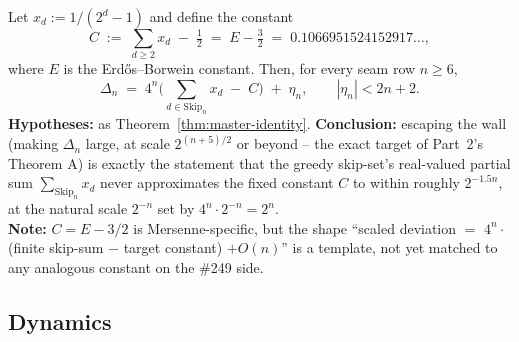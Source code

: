 \begin{thm}
\label{thm:real-form}
Let $x_d := 1/(2^d-1)$ and define the constant
\[
C \;:=\; \sum_{d \ge 2} x_d \;-\; \tfrac12 \;=\; E - \tfrac32 \;=\; 0.1066951524152917\ldots,
\]
where $E$ is the Erd\H{o}s--Borwein constant. Then, for every seam row $n \ge 6$,
\begin{equation*}
\Delta_n \;=\; 4^n \Big( \sum_{d \in \mathrm{Skip}_n} x_d \;-\; C \Big) \;+\; \eta_n, \qquad
|\eta_n| < 2n+2.
\tag{II}
\end{equation*}
\textbf{Hypotheses:} as Theorem~\ref{thm:master-identity}. \textbf{Conclusion:} escaping the wall
(making $\Delta_n$ large, at scale $2^{(n+5)/2}$ or beyond -- the exact target of Part~2's Theorem A)
is exactly the statement that the greedy skip-set's real-valued partial sum $\sum_{\mathrm{Skip}_n}
x_d$ never approximates the fixed constant $C$ to within roughly $2^{-1.5n}$, at the natural scale
$2^{-n}$ set by $4^n \cdot 2^{-n} = 2^n$.  
\\
\textbf{Note:} $C = E - 3/2$ is Mersenne-specific, but the shape ``scaled deviation $=$
$4^n \cdot$(finite skip-sum $-$ target constant) $+ O(n)$'' is a template, not yet matched to any
analogous constant on the \#249 side.
\end{thm}

\subsection{Dynamics}

